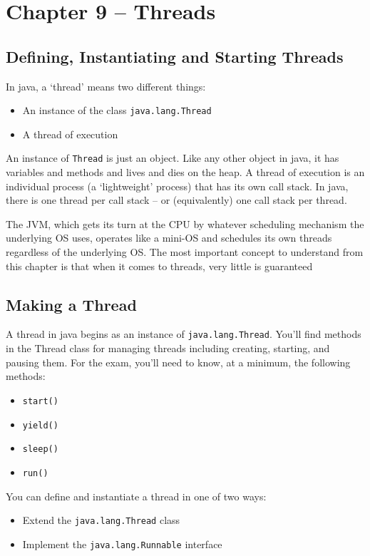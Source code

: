 \section{Chapter 9 -- Threads}
\subsection{Defining, Instantiating and Starting Threads}
In java, a `thread' means two different things:
\begin{itemize}
    \item An instance of the class \verb#java.lang.Thread#
    \item A thread of execution
\end{itemize}
An instance of \verb#Thread# is just an object. Like any other object in java, 
it has variables and methods and lives and dies on the heap. A thread of 
execution is an individual process (a `lightweight' process) that has its own 
call stack. In java, there is one thread per call stack -- or (equivalently) 
one call stack per thread.

The JVM, which gets its turn at the CPU by whatever scheduling mechanism the 
underlying OS uses, operates like a mini-OS and schedules its own threads 
regardless of the underlying OS. The most important concept to understand from 
this chapter is that when it comes to threads, very little is guaranteed

\subsection{Making a Thread}
A thread in java begins as an instance of \verb#java.lang.Thread#. You'll find 
methods in the Thread class for managing threads including creating, starting, 
and pausing them. For the exam, you'll need to know, at a minimum, the 
following methods:
\begin{itemize}
    \item \verb#start()#
    \item \verb#yield()#
    \item \verb#sleep()#
    \item \verb#run()#
\end{itemize}
You can define and instantiate a thread in one of two ways:
\begin{itemize}
    \item Extend the \verb#java.lang.Thread# class
    \item Implement the \verb#java.lang.Runnable# interface
\end{itemize}

